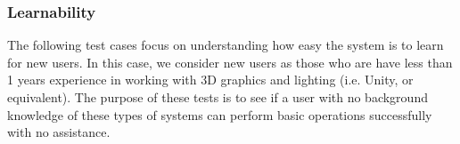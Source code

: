 \documentclass[12pt, titlepage]{article}
\begin{document}
%
%	
%	
%	
%	
%	
%	
%
%
%	
%	
%	
%	
%	
%

\subsubsection{Learnability}
The following test cases focus on understanding how easy the system is to learn 
for new users. In this case, we consider new users as those who are have less 
than 1 years experience in working with 3D graphics and lighting (i.e. Unity, 
or equivalent). The purpose of these tests is to see if a user with no 
background knowledge of these types of systems can perform basic operations 
successfully with no assistance.
\end{document}
